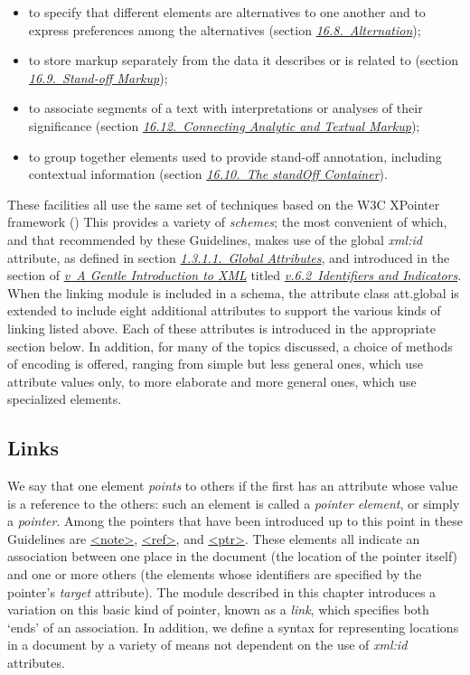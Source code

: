 \begin{itemize}
\item to specify that different elements are alternatives to one another and to express preferences among the alternatives (section \textit{\hyperref[SAAT]{16.8.\ Alternation}});
\item to store markup separately from the data it describes or is related to (section \textit{\hyperref[SASO]{16.9.\ Stand-off Markup}});
\item to associate segments of a text with interpretations or analyses of their significance (section \textit{\hyperref[SAAN]{16.12.\ Connecting Analytic and Textual Markup}});
\item to group together elements used to provide stand-off annotation, including contextual information (section \textit{\hyperref[SASOstdf]{16.10.\ The standOff Container}}).
\end{itemize} \par
These facilities all use the same set of techniques based on the W3C XPointer framework (\cite{XPTRFMWK}) This provides a variety of \textit{schemes}; the most convenient of which, and that recommended by these Guidelines, makes use of the global {\itshape xml:id} attribute, as defined in section \textit{\hyperref[STGA]{1.3.1.1.\ Global Attributes}}, and introduced in the section of \textit{\hyperref[SG]{v\ A Gentle Introduction to XML}} titled \textit{\hyperref[SG-id]{v.6.2\ Identifiers and Indicators}}. When the \textsf{linking} module is included in a schema, the attribute class \textsf{att.global} is extended to include eight additional attributes to support the various kinds of linking listed above. Each of these attributes is introduced in the appropriate section below. In addition, for many of the topics discussed, a choice of methods of encoding is offered, ranging from simple but less general ones, which use attribute values only, to more elaborate and more general ones, which use specialized elements.
\subsection[{Links}]{Links}\label{SAPT}\par
We say that one element \textit{points} to others if the first has an attribute whose value is a reference to the others: such an element is called a \textit{pointer element}, or simply a \textit{pointer}. Among the pointers that have been introduced up to this point in these Guidelines are \hyperref[TEI.note]{<note>}, \hyperref[TEI.ref]{<ref>}, and \hyperref[TEI.ptr]{<ptr>}. These elements all indicate an association between one place in the document (the location of the pointer itself) and one or more others (the elements whose identifiers are specified by the pointer's {\itshape target} attribute). The module described in this chapter introduces a variation on this basic kind of pointer, known as a \textit{link}, which specifies both ‘ends’ of an association. In addition, we define a syntax for representing locations in a document by a variety of means not dependent on the use of {\itshape xml:id} attributes.
